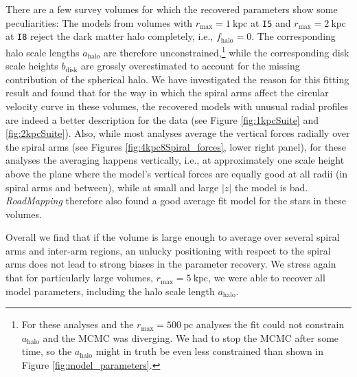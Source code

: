 \documentclass[iop,revtex4,numberedappendix,appendixfloats]{emulateapj}
\newcommand{\RM}{{\sl RoadMapping}}
\newcommand{\OLD}[1]{}
\begin{document}
There are a few survey volumes for which the recovered parameters show some peculiarities: The models from volumes with $r_\text{max}=1~\text{kpc}$ at \texttt{I5} and $r_\text{max}=2~\text{kpc}$ at \texttt{I8} reject the dark matter halo completely, i.e., $f_\text{halo}=0$. The corresponding halo scale lengths $a_\text{halo}$ are therefore unconstrained,\footnote{For these analyses and the $r_\text{max}=500~\text{pc}$ analyses the fit could not constrain $a_\text{halo}$ and the MCMC was diverging. We had to stop the MCMC after some time, so the $a_\text{halo}$ might in truth be even less constrained than shown in Figure \ref{fig:model_parameters}.} while the corresponding disk scale heights $b_\text{disk}$ are grossly overestimated to account for the missing contribution of the spherical halo. We have investigated the reason for this fitting result and found that for the way in which the spiral arms affect the circular velocity curve in these volumes, the recovered models with unusual radial profiles are indeed a better description for the data (see Figure \ref{fig:1kpcSuite} and \ref{fig:2kpcSuite}). Also, while most analyses average the vertical forces radially over the spiral arms (see Figures \ref{fig:4kpc8Spiral_forces}, lower right panel), for these analyses the averaging happens vertically, i.e., at approximately one scale height above the plane where the model's vertical forces are equally good at all radii (in spiral arms and between), while at small and large $|z|$ the model is bad\OLD{ (see also Figure \ref{fig:Fg_vs_z} in Section \ref{sec:forces_bias})}. \RM{} therefore also found a good average fit model for the stars in these volumes. 

Overall we find that if the volume is large enough to average over several spiral arms and inter-arm regions, an unlucky positioning with respect to the spiral arms does not lead to strong biases in the parameter recovery. We stress again that for particularly large volumes, $r_\text{max}=5~\text{kpc}$, we were able to recover all model parameters, including the halo scale length $a_\text{halo}$.
\end{document}
